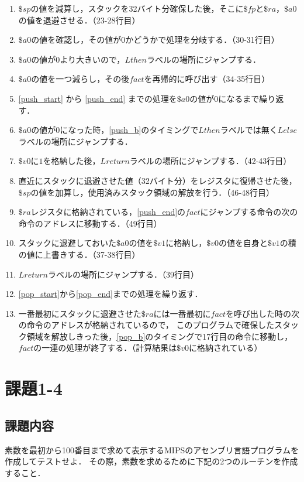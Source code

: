 \documentclass[a4j,11pt]{jarticle}
\begin{document}
\begin{enumerate}
      \item \label{push_start} $\$sp$の値を減算し，スタックを32バイト分確保した後，そこに$\$fp$と$\$ra$，$\$a0$の値を退避させる．（23-28行目）
      \item $\$a0$の値を確認し，その値が$0$かどうかで処理を分岐する．（30-31行目）
      \item \label{push_b}$\$a0$の値が$0$より大きいので，$Lthen$ラベルの場所にジャンプする．
      \item \label{push_end}$\$a0$の値を一つ減らし，その後$fact$を再帰的に呼び出す（34-35行目）
      \item \ref{push_start} から \ref{push_end} までの処理を$\$a0$の値が$0$になるまで繰り返す．
      \item $\$a0$の値が$0$になった時，\ref{push_b}のタイミングで$Lthen$ラベルでは無く$Lelse$ラベルの場所にジャンプする．
      \item $\$v0$に$1$を格納した後，$Lreturn$ラベルの場所にジャンプする．（42-43行目）
      \item \label{pop_start}直近にスタックに退避させた値（32バイト分）をレジスタに復帰させた後，$\$sp$の値を加算し，使用済みスタック領域の解放を行う．（46-48行目）
      \item \label{pop_b}$\$ra$レジスタに格納されている，\ref{push_end}の$fact$にジャンプする命令の次の命令のアドレスに移動する．（49行目）
      \item スタックに退避しておいた$\$a0$の値を$\$v1$に格納し，$\$v0$の値を自身と$\$v1$の積の値に上書きする．（37-38行目）
      \item \label{pop_end}$Lreturn$ラベルの場所にジャンプする．（39行目）
      \item \ref{pop_start}から\ref{pop_end}までの処理を繰り返す．
      \item 一番最初にスタックに退避させた$\$ra$には一番最初に$fact$を呼び出した時の次の命令のアドレスが格納されているので，
      このプログラムで確保したスタック領域を解放しきった後，\ref{pop_b}のタイミングで17行目の命令に移動し，$fact$の一連の処理が終了する．（計算結果は$\$v0$に格納されている）
\end{enumerate}

\section{課題1-4}
\subsection{課題内容}
素数を最初から100番目まで求めて表示するMIPSのアセンブリ言語プログラムを作成してテストせよ． 
その際，素数を求めるために下記の2つのルーチンを作成すること．
\end{document}
